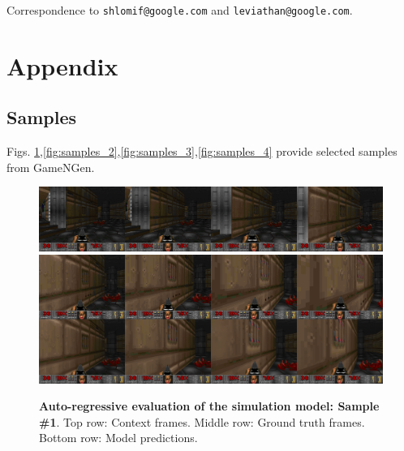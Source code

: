 \documentclass{article} %
\begin{document}
Correspondence to \texttt{shlomif@google.com} and \texttt{leviathan@google.com}.




\clearpage

\newpage

\appendix
\section{Appendix}

\subsection{Samples}
\label{appendix-samples}
Figs. \ref{fig:samples_1},\ref{fig:samples_2},\ref{fig:samples_3},\ref{fig:samples_4} provide selected samples from GameNGen.
\begin{figure}[h]
    \centering
    \includegraphics[width=1.0\textwidth]{figures/samples/context_1.png}
    \includegraphics[width=1.0\textwidth]{figures/samples/gt_vs_predicted_1.png}
    \caption{\textbf{Auto-regressive evaluation of the simulation model: Sample \#1}. Top row: Context frames. Middle row: Ground truth frames. Bottom row: Model predictions.}
    \label{fig:samples_1}
\end{figure}
\end{document}
